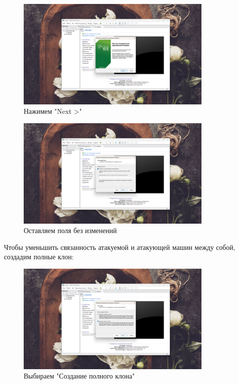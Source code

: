 \documentclass[a4paper]{article}
\begin{document}
  \begin{figure}[H]
    \centering
    \includegraphics[width=0.85\textwidth]{03_00 (14)}
    \caption{Нажимем "Next >"}
    \label{img:14}
  \end{figure}

  \begin{figure}[H]
    \centering
    \includegraphics[width=0.85\textwidth]{03_00 (15)}
    \caption{Оставляем поля без изменений}
    \label{img:15}
  \end{figure}

  Чтобы уменьшить связанность атакуемой и атакующей машин между собой,
  создадим полные клон:

  \begin{figure}[H]
    \centering
    \includegraphics[width=0.85\textwidth]{03_00 (16)}
    \caption{Выбираем "Создание полного клона"}
    \label{img:16}
  \end{figure}
\end{document}
